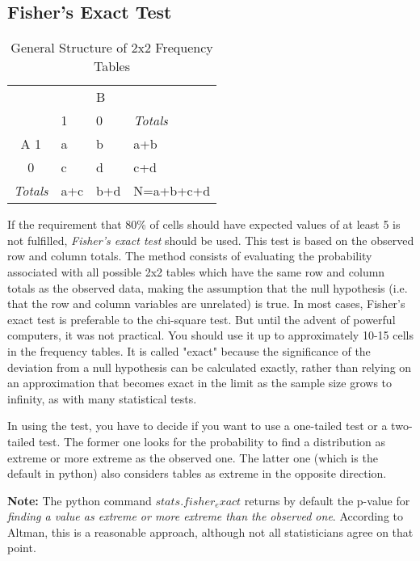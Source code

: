 \subsection{Fisher's Exact Test} 

\begin{table}
  \centering
  \begin{tabular}{|c|l l| l|}
  \hline
  &  & B &  \\
  & 1 & 0 & \emph{Totals} \\
  \hline
  A 1 & a & b & a+b \\
    0 & c & d & c+d \\
  \hline
  \emph{Totals} & a+c & b+d & N=a+b+c+d \\
  \hline
  \end{tabular}

  \caption{General Structure of 2x2 Frequency Tables}\label{table:frequencyGeneral}
\end{table}


If the requirement that 80\% of cells should have expected values of at least 5 is not fulfilled, \emph{Fisher's exact test} should be used. This test is based on the observed row and column totals. The method consists of evaluating the probability associated with all possible 2x2 tables which have the same row and column totals as the observed data, making the assumption that the null hypothesis (i.e. that the row and column variables are unrelated) is true.  In most cases, Fisher's exact test is preferable to the chi-square test. But until the advent of powerful computers, it was not practical. You should use it up to approximately 10-15 cells in the frequency tables. It is called "exact" because the significance of the deviation from a null hypothesis can be calculated exactly, rather than relying on an approximation that becomes exact in the limit as the sample size grows to infinity, as with many statistical tests.

In using the test, you have to decide if you want to use a one-tailed test or a two-tailed test. The former one looks for the probability to find a distribution as extreme or more extreme as the observed one. The latter one (which is the default in python) also considers tables as extreme in the opposite direction.

\textbf{Note:} The python command $stats.fisher_exact$ returns by default the p-value for \emph{finding a value as extreme or more extreme than the observed one}. According to Altman, this is a reasonable approach, although not all statisticians agree on that point.

